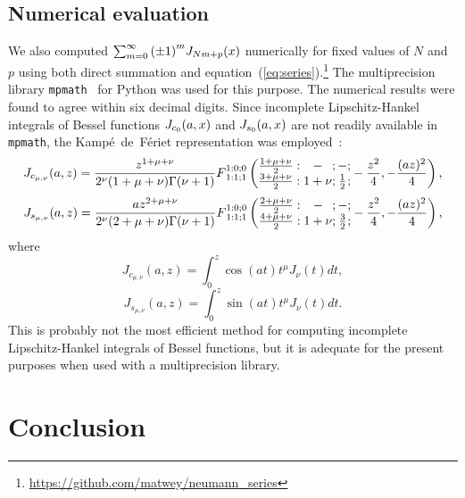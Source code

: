 \documentclass{article}
\begin{document}
\subsection{Numerical evaluation}
We also computed $\sum_{m=0}^{\infty} \qty(\pm 1)^m J_{N m+p}(x)$ numerically for fixed values of $N$ and $p$ using both direct summation and equation~(\ref{eq:series}).\footnote{\url{https://github.com/matwey/neumann_series}}
The multiprecision library {\tt mpmath}~\cite{mpmath} for Python was used for this purpose.
The numerical results were found to agree within six decimal digits.
Since incomplete Lipschitz-Hankel integrals of Bessel functions $\JC0(a,x)$ and $\JS0(a,x)$ are not readily available in {\tt mpmath},
the Kampé~de~Fériet representation was employed~\cite{Miller1989}:
\begin{equation}
J_{c_{\mu,\nu}}(a, z) = \frac{z^{1+\mu+\nu}}{2^\nu (1+\mu+\nu) \Gamma(\nu+1)} 
F{}^{1:0;0}_{1:1;1}\left(
\setlength{\arraycolsep}{0pt}
\begin{array}{c@{{}:{}}c@{{};{}}c@{{};}}
\frac{1+\mu+\nu}{2} & - & - \\
\frac{3+\mu+\nu}{2} & 1+\nu & \frac{1}{2}
\end{array}
-\dfrac{z^2}{4}, -\dfrac{(a z)^2}{4}
\right),
\end{equation}
\begin{equation}
J_{s_{\mu,\nu}}(a, z) = \frac{a z^{2+\mu+\nu}}{2^\nu (2+\mu+\nu) \Gamma(\nu+1)}
F{}^{1:0;0}_{1:1;1}\left(
\setlength{\arraycolsep}{0pt}
\begin{array}{c@{{}:{}}c@{{};{}}c@{{};}}
\frac{2+\mu+\nu}{2} & - & - \\
\frac{4+\mu+\nu}{2} & 1+\nu & \frac{3}{2}
\end{array}
-\dfrac{z^2}{4}, -\dfrac{(a z)^2}{4}
\right),
\end{equation}
where
\begin{equation}
J_{c_{\mu,\nu}}(a, z) = \int_0^z \cos(a t) t^\mu J_\nu(t) dt,
\end{equation}
\begin{equation}
J_{s_{\mu,\nu}}(a, z) = \int_0^z \sin(a t) t^\mu J_\nu(t) dt.
\end{equation}
This is probably not the most efficient method for computing incomplete Lipschitz-Hankel integrals of Bessel functions, but it is adequate for the present purposes when used with a multiprecision library.

\section{Conclusion}
\label{sec:conclusion}
\end{document}
